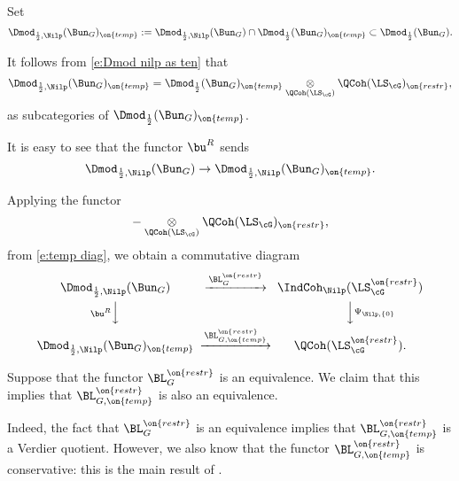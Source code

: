 \documentclass[9pt]{amsart}
\theoremstyle{remark}
\theoremstyle{definition}
\theoremstyle{remark}
\numberwithin{equation}{section}
\begin{document}
%

\sssec{}

Set
$$\Dmod_{\frac{1}{2},\Nilp}(\Bun_G)_{\on{temp}}:=\Dmod_{\frac{1}{2},\Nilp}(\Bun_G)\cap \Dmod_{\frac{1}{2}}(\Bun_G)_{\on{temp}}\subset
\Dmod_{\frac{1}{2}}(\Bun_G).$$

It follows from \eqref{e:Dmod nilp as ten} that
$$\Dmod_{\frac{1}{2},\Nilp}(\Bun_G)_{\on{temp}}=
\Dmod_{\frac{1}{2}}(\Bun_G)_{\on{temp}}\underset{\QCoh(\LS_\cG)}\otimes \QCoh(\LS_\cG)_{\on{restr}},$$
as subcategories of $\Dmod_{\frac{1}{2}}(\Bun_G)_{\on{temp}}$.

\medskip

It is easy to see that the functor $\bu^R$ sends
$$\Dmod_{\frac{1}{2},\Nilp}(\Bun_G)\to \Dmod_{\frac{1}{2},\Nilp}(\Bun_G)_{\on{temp}}.$$

\medskip

Applying the functor
$$-\underset{\QCoh(\LS_\cG)}\otimes \QCoh(\LS_\cG)_{\on{restr}},$$
from \eqref{e:temp diag}, we obtain a commutative diagram 
\begin{equation} \label{e:temp diag restr}
\CD
\Dmod_{\frac{1}{2},\Nilp}(\Bun_G)  @>{\BL^{\on{restr}}_G}>> \IndCoh_\Nilp(\LS^{\on{restr}}_\cG) \\
@V{\bu^R}VV @VV{\Psi_{\Nilp,\{0\}}}V \\
\Dmod_{\frac{1}{2},\Nilp}(\Bun_G)_{\on{temp}} @>{\BL^{\on{restr}}_{G,\on{temp}}}>> \QCoh(\LS^{\on{restr}}_\cG). 
\endCD
\end{equation}

\sssec{}

Suppose that the functor $\BL^{\on{restr}}_G$ is an equivalence. We claim that this implies that 
$\BL^{\on{restr}}_{G,\on{temp}}$ is also an equivalence. 

\medskip

Indeed, the fact that $\BL^{\on{restr}}_G$ is an equivalence implies that $\BL^{\on{restr}}_{G,\on{temp}}$ 
is a Verdier quotient. However, we also know that the functor $\BL^{\on{restr}}_{G,\on{temp}}$ is conservative: 
this is the main result of \cite{FR}. 
\end{document}
